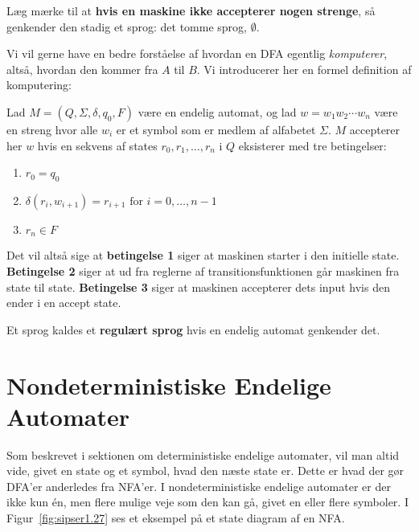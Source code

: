 Læg mærke til at \textbf{hvis en maskine ikke accepterer nogen strenge}, så genkender den stadig et sprog: det tomme sprog, $\emptyset$.

Vi vil gerne have en bedre forståelse af hvordan en DFA egentlig \textit{komputerer}, altså, hvordan den kommer fra $A$ til $B$. Vi introducerer her en formel definition af komputering:

\begin{definition}
	\label{def:DFAKomputering}
	Lad $M = (Q, \Sigma, \delta, q_{0}, F)$ være en endelig automat, og lad $w = w_{1}w_{2} \cdots w_{n}$ være en streng hvor alle $w_i$ er et symbol som er medlem af alfabetet $\Sigma$. $M$ accepterer her $w$ hvis en sekvens af states $r_{0}, r_{1}, \ldots, r_{n}$ i $Q$ eksisterer med tre betingelser:
	\begin{enumerate}
		\item $r_{0} = q_{0}$
		\item $\delta(r_{i}, w_{i+1}) = r_{i+1} \text{ for } i = 0, \ldots, n-1$
		\item $r_{n} \in F$
	\end{enumerate}
\end{definition}

Det vil altså sige at \textbf{betingelse 1} siger at maskinen starter i den initielle state. \textbf{Betingelse 2} siger at ud fra reglerne af transitionsfunktionen går maskinen fra state til state. \textbf{Betingelse 3} siger at maskinen accepterer dets input hvis den ender i en accept state.

\begin{definition}
	Et sprog kaldes et \textbf{regulært sprog} hvis en endelig automat genkender det.
\end{definition}


\newpage
\section{Nondeterministiske Endelige Automater}

Som beskrevet i sektionen om deterministiske endelige automater, vil man altid vide, givet en state og et symbol, hvad den næste state er. Dette er hvad der gør DFA'er anderledes fra NFA'er. I nondeterministiske endelige automater er der ikke kun én, men flere mulige veje som den kan gå, givet en eller flere symboler. I Figur~\ref{fig:sipser1.27} ses et eksempel på et state diagram af en NFA.

